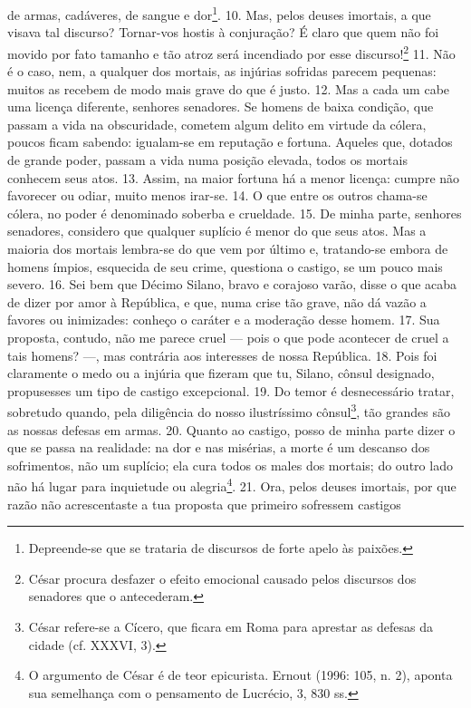 de armas, cadáveres, de sangue e dor\footnote{Depreende-se que se trataria de
discursos de forte apelo às paixões.}. 10. Mas, pelos deuses imortais, a que
visava tal discurso? Tornar-vos hostis à conjuração? É claro que quem não foi
movido por fato tamanho e tão atroz será incendiado por esse
discurso!\footnote{César procura desfazer o efeito emocional causado pelos
discursos dos senadores que o antecederam.} 11. Não é o caso, nem, a qualquer
dos mortais, as injúrias sofridas parecem pequenas: muitos as recebem de modo
mais grave do que é justo. 12. Mas a cada um cabe uma licença diferente,
senhores senadores. Se homens de baixa condição, que passam a vida na
obscuridade, cometem algum delito em virtude da cólera, poucos ficam sabendo:
igualam-se em reputação e fortuna. Aqueles que, dotados de grande poder, passam
a vida numa posição elevada, todos os mortais conhecem seus atos. 13. Assim, na
maior fortuna há a menor licença: cumpre não favorecer ou odiar, muito menos
irar-se. 14. O que entre os outros chama-se cólera, no poder é denominado
soberba e crueldade. 15. De minha parte, senhores senadores, considero que
qualquer suplício é menor do que seus atos. Mas a maioria dos mortais lembra-se
do que vem por último e, tratando-se embora de homens ímpios, esquecida de seu
crime, questiona o castigo, se um pouco mais severo. 16. Sei bem que Décimo
Silano, bravo e corajoso varão, disse o que acaba de dizer por amor à
República, e que, numa crise tão grave, não dá vazão a favores ou inimizades:
conheço o caráter e a moderação desse homem. 17. Sua proposta, contudo, não me
parece cruel --- pois o que pode acontecer de cruel a tais homens? ---, mas
contrária aos interesses de nossa República. 18. Pois foi claramente o medo ou
a injúria que fizeram que tu, Silano,  cônsul designado, propusesses um tipo de
castigo excepcional. 19. Do temor é desnecessário tratar, sobretudo quando,
pela diligência do nosso ilustríssimo cônsul\footnote{César refere-se a Cícero,
que ficara em Roma para aprestar as defesas da cidade (cf. XXXVI, 3).}, tão
grandes são as nossas defesas em armas. 20. Quanto ao castigo, posso de minha
parte dizer o que se passa na realidade: na dor e nas misérias, a morte é um
descanso dos sofrimentos, não um suplício; ela cura todos os males dos mortais;
do outro lado não há lugar para inquietude ou alegria\footnote{O argumento de
César é de teor epicurista. Ernout (1996: 105, n. 2), aponta sua semelhança com o 
pensamento  de Lucrécio, 3, 830 ss.}. 21. Ora, pelos deuses imortais, por que
razão não acrescentaste a tua proposta que primeiro sofressem castigos
